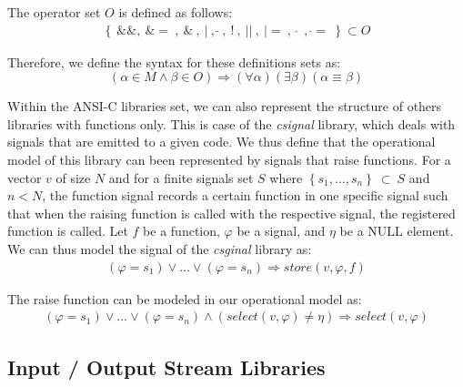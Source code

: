 \documentclass[a4paper]{llncs}
\begin{document}
The operator set $O$ is defined as follows:
%
\begin{eqnarray}
\label{ciso646-operator-set}
\left\{
\: \&\&,
\: \&= \:,
\: \& \:,
\: | \:,
\: \widetilde{} \:,
\: ! \:,
\: || \:,
\: |= \:,
\:\: \widehat{} \:\:,
\: \widehat{}= \:
\right\} \subset O
\end{eqnarray}

Therefore, we define the syntax for these definitions sets as:
%
\begin{equation}
\left( \alpha \in M \wedge \beta \in O \right) \Rightarrow \left(\forall\alpha\right)\left(\exists\beta\right)\left(\alpha\equiv\beta\right)
\label{eq:csi646-definitions}
\end{equation}

Within the ANSI-C libraries set, we can also represent the structure
of others libraries with functions only. This is case of the \textit{csignal}
library, which deals with signals that are emitted to a given code.
We thus define that the operational model of this library can been represented
by signals that raise functions. For a vector $v$ of size $N$ and
for a finite signals set $S$ where $\left\{s_{1},\ldots, s_{n}\right\}\:\subset\:S$
and $n < N$, the function signal records a certain function in one specific signal
such that when the raising function is called with the respective signal,
the registered function is called. Let $f$ be a function, $\varphi$ be a signal,
and $\eta$ be a NULL element. We can thus model the signal of the \textit{csginal} library as:
%
\begin{eqnarray}
\label{c-csignal}
\left(\varphi = s_{1}\right) \vee \ldots \vee \left(\varphi = s_{n}\right) \Rightarrow store\left(v,\varphi,f\right)
\end{eqnarray}

The raise function can be modeled in our operational model as:
%
\begin{eqnarray}
\label{r-csignal}
\left(\varphi = s_{1}\right) \vee \ldots \vee \left(\varphi = s_{n}\right) \wedge \left(select\left(v,\varphi\right) \neq \eta\right) \Rightarrow select\left(v,\varphi\right)
\end{eqnarray}

\subsection{Input / Output Stream Libraries}
\end{document}
